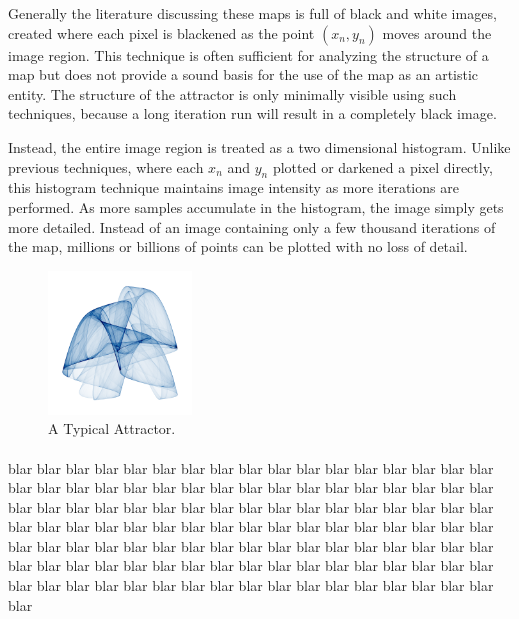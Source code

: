 \documentclass{acmsiggraph}
\begin{document}
Generally the literature discussing these maps is full of black and white
images, created where each pixel is blackened as the point $(x_n, y_n)$
moves around the image region. This technique is often sufficient for
analyzing the structure of a map but does not provide a sound basis for
the use of the map as an artistic entity. The structure of the attractor
is only minimally visible using such techniques, because a long iteration
run will result in a completely black image.

Instead, the entire image region is treated as a two dimensional histogram.
Unlike previous techniques, where each $x_n$ and $y_n$ plotted or darkened
a pixel directly, this histogram technique maintains image intensity as
more iterations are performed. As more samples accumulate in the histogram,
the image simply gets more detailed. Instead of an image containing only a
few thousand iterations of the map, millions or billions of points can be
plotted with no loss of detail.

\begin{figure}[ht]
\centering
\includegraphics[width=1.5in]{1.png}
\caption{A Typical Attractor.}
\end{figure}



\paragraph*{}
blar blar blar blar blar blar blar blar blar blar blar blar blar blar blar
blar blar blar blar blar blar blar blar blar blar blar blar blar blar blar
blar blar blar blar blar blar blar blar blar blar blar blar blar blar blar
blar blar blar blar blar blar blar blar blar blar blar blar blar blar blar
blar blar blar blar blar blar blar blar blar blar blar blar blar blar blar
blar blar blar blar blar blar blar blar blar blar blar blar blar blar blar
blar blar blar blar blar blar blar blar blar blar blar blar blar blar blar
blar blar blar blar blar blar blar blar blar blar blar blar blar blar blar
\end{document}
